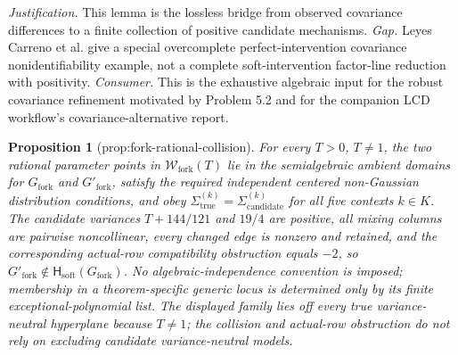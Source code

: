 \documentclass{article}
\newtheorem{proposition}{Proposition}
\begin{document}
\par\smallskip\noindent \textit{Justification.} This lemma is the lossless bridge from observed covariance differences to a finite collection of positive candidate mechanisms. \textit{Gap.} Leyes Carreno et al. give a special overcomplete perfect-intervention covariance nonidentifiability example, not a complete soft-intervention factor-line reduction with positivity. \textit{Consumer.} This is the exhaustive algebraic input for the robust covariance refinement motivated by Problem 5.2 and for the companion LCD workflow's covariance-alternative report.

\begin{proposition}[prop:fork-rational-collision]\label{prop:fork-rational-collision}
For every \(T>0\), \(T\ne1\), the two rational parameter points in \(\mathcal W_{\mathrm{fork}}(T)\) lie in the semialgebraic ambient domains for \(G_{\mathrm{fork}}\) and \(G'_{\mathrm{fork}}\), satisfy the required independent centered non-Gaussian distribution conditions, and obey \(\Sigma^{(k)}_{\mathrm{true}}=\Sigma^{(k)}_{\mathrm{candidate}}\) for all five contexts \(k\in K\). The candidate variances \(T+144/121\) and \(19/4\) are positive, all mixing columns are pairwise noncollinear, every changed edge is nonzero and retained, and the corresponding actual-row compatibility obstruction equals \(-2\), so \(G'_{\mathrm{fork}}\notin\mathsf H_{\mathrm{soft}}(G_{\mathrm{fork}})\). No algebraic-independence convention is imposed; membership in a theorem-specific generic locus is determined only by its finite exceptional-polynomial list. The displayed family lies off every true variance-neutral hyperplane because \(T\ne1\); the collision and actual-row obstruction do not rely on excluding candidate variance-neutral models.
\end{proposition}
\end{document}
